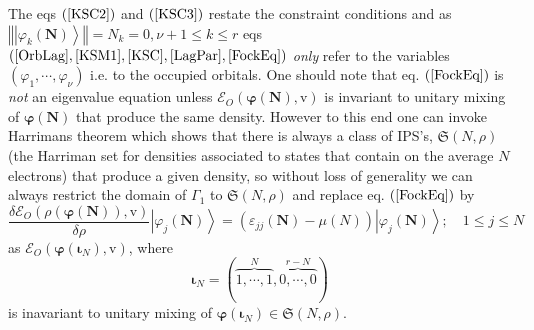 \documentclass[aps,preprint]{revtex4}%
\begin{document}
The eqs $\left(  \ref{KSC2}\right)  $ and $\left(  \ref{KSC3}\right)  $
restate the constraint conditions and as $\left\Vert \left\vert \varphi
_{k}\left(  \boldsymbol{N}\right)  \right\rangle \right\Vert =N_{k}%
=0,\nu+1\leq k\leq r$ eqs $\left(  \ref{OrbLag},\ref{KSM1},\ref{KSC}%
,\ref{LagPar},\ref{FockEq}\right)  $ \emph{only} refer to the variables
$\left(  \varphi_{1},\cdots,\varphi_{\nu}\right)  $ i.e. to the occupied
orbitals. One should note that eq. $\left(  \ref{FockEq}\right)  $ is
\emph{not }an eigenvalue equation unless $\mathcal{E}_{O}\left(
\boldsymbol{\varphi}\left(  \boldsymbol{N}\right)  ,\mathrm{v}\right)  $ is
invariant to unitary mixing of $\boldsymbol{\varphi}\left(  \boldsymbol{N}%
\right)  $ that produce the same density. However to this end one can invoke
Harrimans theorem \cite{Harriman81} which shows that there is always a class
of IPS's, $\mathfrak{S}\left(  N,\rho\right)  $ (the Harriman set for
densities associated to states that contain on the average $N$ electrons) that
produce a given density, so without loss of generality we can always restrict
the domain of $\Gamma_{1}$ to $\mathfrak{S}\left(  N,\rho\right)  $ and
replace eq. $\left(  \ref{FockEq}\right)  $ by
\begin{equation}
\frac{\delta\mathcal{E}_{O}\left(  \rho\left(  \boldsymbol{\varphi\left(
\boldsymbol{N}\right)  }\right)  \boldsymbol{,}\mathrm{v}\right)  }{\delta
\rho}\left\vert \varphi_{j}\left(  \boldsymbol{N}\right)  \right\rangle
=\left(  \varepsilon_{jj}\left(  \boldsymbol{N}\right)  -\mu\left(  N\right)
\right)  \left\vert \varphi_{j}\left(  \boldsymbol{N}\right)  \right\rangle
;\quad1\leq j\leq N \label{FockHarri}%
\end{equation}
as $\mathcal{E}_{O}\left(  \boldsymbol{\varphi}\left(  \boldsymbol{\iota}%
_{N}\right)  ,\mathrm{v}\right)  $, where
\begin{equation}
\boldsymbol{\iota}_{N}=\left(  \overset{N}{\overbrace{1,\cdots,1}}%
,\overset{r-N}{\overbrace{0,\cdots,0}}\right)
\end{equation}
is inavariant to unitary mixing of $\boldsymbol{\varphi}\left(
\boldsymbol{\iota}_{N}\right)  \in\mathfrak{S}\left(  N,\rho\right)  .$
\end{document}
